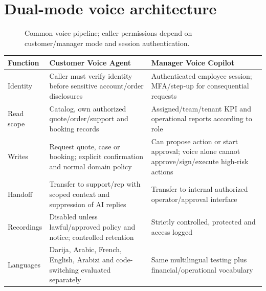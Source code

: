 \documentclass[10.5pt,a4paper,oneside]{article}
\begin{document}
\section{Dual-mode voice architecture}
\begin{figure}[H]
\centering
{}
\caption{Common voice pipeline; caller permissions depend on customer/manager mode and session authentication.}
\end{figure}
\begin{tabularx}{\textwidth}{@{}L{40mm}Y Y@{}}
\toprule{}\textbf{Function} & \textbf{Customer Voice Agent} & \textbf{Manager Voice Copilot}\\\midrule
Identity & Caller must verify identity before sensitive account/order disclosures & Authenticated employee session; MFA/step-up for consequential requests\\
Read scope & Catalog, own authorized quote/order/support and booking records & Assigned/team/tenant KPI and operational reports according to role\\
Writes & Request quote, case or booking; explicit confirmation and normal domain policy & Can propose action or start approval; voice alone cannot approve/sign/execute high-risk actions\\
Handoff & Transfer to support/rep with scoped context and suppression of AI replies & Transfer to internal authorized operator/approval interface\\
Recordings & Disabled unless lawful/approved policy and notice; controlled retention & Strictly controlled, protected and access logged\\
Languages & Darija, Arabic, French, English, Arabizi and code-switching evaluated separately & Same multilingual testing plus financial/operational vocabulary\\
\bottomrule
\end{tabularx}\par\medskip
\end{document}
